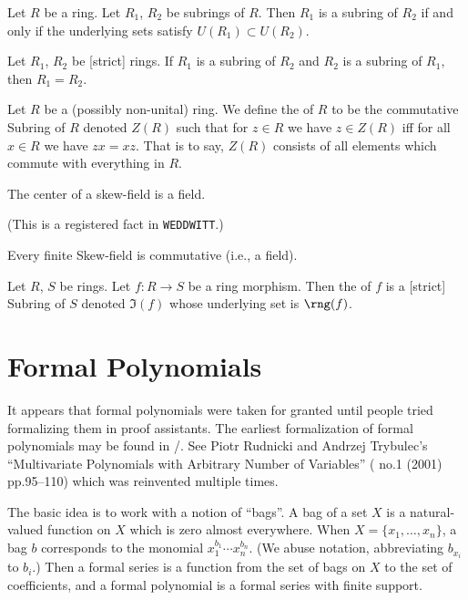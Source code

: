 \begin{theorem}
Let $R$ be a ring. Let $R_{1}$, $R_{2}$ be subrings of $R$.
Then $R_{1}$ is a subring of $R_{2}$ if and only if the underlying
sets satisfy $U(R_{1})\subset U(R_{2})$.
\end{theorem}

\begin{theorem}
Let $R_{1}$, $R_{2}$ be [strict] rings.
If $R_{1}$ is a subring of $R_{2}$ and $R_{2}$ is a subring of
$R_{1}$, then $R_{1}=R_{2}$.
\end{theorem}

\begin{definition}
Let $R$ be a (possibly non-unital) ring. We define the  of $R$
to be the commutative Subring of $R$ denoted $Z(R)$ such that
for $z\in R$ we have $z\in Z(R)$ iff for all $x\in R$ we have $zx=xz$.
That is to say, $Z(R)$ consists of all elements which commute with
everything in $R$.
\end{definition}

\begin{theorem}
The center of a skew-field is a field.
\end{theorem}

(This is a registered fact in \texttt{WEDDWITT}.)

\begin{theorem}
Every finite Skew-field is commutative (i.e., a field).
\end{theorem}

\begin{definition}
Let $R$, $S$ be rings. Let $f\colon R\to S$ be a ring morphism.
Then the  of $f$ is a [strict] Subring of $S$ denoted $\Im(f)$
whose underlying set is $\rng(f)$.
\end{definition}

\section{Formal Polynomials}

\begin{remark}
It appears that formal polynomials were taken for granted until people
tried formalizing them in proof assistants. The earliest formalization
of formal polynomials may be found in \Mizar/. See Piotr Rudnicki
and Andrzej Trybulec's ``Multivariate Polynomials with Arbitrary
Number of Variables'' (
no.1 (2001) pp.95--110) which was reinvented multiple times.\nocite{rudnicki2001multivariate}

The basic idea is to work with a notion of ``bags''. A bag of a set
$X$ is a natural-valued function on $X$ which is zero almost everywhere.
When $X=\{x_{1},\dots,x_{n}\}$, a bag $b$ corresponds to the monomial
$x_{1}^{b_{1}}\cdots x_{n}^{b_{n}}$. (We abuse notation, abbreviating
$b_{x_{i}}$ to $b_{i}$.) Then a formal series is a
function from the set of bags on $X$ to the set of coefficients, and a
formal polynomial is a formal series with finite support.
\end{remark}

